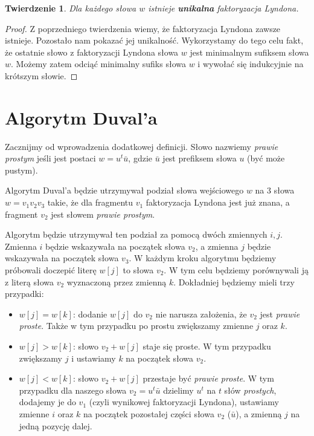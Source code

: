 \documentclass{article}
\newtheorem{theorem}{Twierdzenie}
\begin{document}
\begin{theorem}
    Dla każdego słowa $w$ istnieje \textbf{unikalna} faktoryzacja Lyndona.
\end{theorem}

\begin{proof}
    Z poprzedniego twierdzenia wiemy, że faktoryzacja Lyndona zawsze istnieje. Pozostało nam pokazać jej unikalność.
    Wykorzystamy do tego celu fakt, że ostatnie słowo z faktoryzacji Lyndona słowa $w$ jest minimalnym sufiksem słowa $w$. 
    Możemy zatem odciąć minimalny sufiks słowa $w$ i wywołać się indukcyjnie na krótszym słowie.
\end{proof}

\section{Algorytm Duval'a}

Zacznijmy od wprowadzenia dodatkowej definicji. Słowo nazwiemy \textit{prawie prostym} jeśli jest postaci $w = u^t\bar{u}$, gdzie 
$\bar{u}$ jest prefiksem słowa $u$ (być może pustym).

Algorytm Duval'a będzie utrzymywał podział słowa wejściowego $w$ na $3$ słowa $w=v_1v_2v_3$ takie, że dla fragmentu $v_1$ faktoryzacja Lyndona jest już znana, 
a fragment $v_2$ jest słowem \textit{prawie prostym}. 

Algorytm będzie utrzymywał ten podział za pomocą dwóch zmiennych $i, j$. Zmienna $i$ będzie wskazywała na początek słowa $v_2$, a zmienna $j$ będzie wskazywała na początek słowa $v_3$. 
W każdym kroku algorytmu będziemy próbowali doczepić literę $w[j]$ to słowa $v_2$. W tym celu będziemy porównywali ją z literą słowa $v_2$ wyznaczoną przez zmienną $k$. 
Dokładniej będziemy mieli trzy przypadki:
\begin{itemize}
    \item $w[j] = w[k]$: dodanie $w[j]$ do $v_2$ nie narusza założenia, że $v_2$ jest \textit{prawie proste}. Także w tym przypadku po prostu zwiększamy zmienne $j$ oraz $k$.
    \item $w[j] > w[k]$: słowo $v_2 + w[j]$ staje się proste. W tym przypadku zwiększamy $j$ i ustawiamy $k$ na początek słowa $v_2$.
    \item $w[j] < w[k]$: słowo $v_2 + w[j]$ przestaje być \textit{prawie proste}. W tym przypadku dla naszego słowa $v_2 = u^t\bar{u}$ dzielimy $u^t$ na $t$ słów \textit{prostych},
    dodajemy je do $v_1$ (czyli wynikowej faktoryzacji Lyndona), ustawiamy zmienne $i$ oraz $k$ na początek pozostałej części słowa $v_2$ ($\bar{u}$), a zmienną $j$ na jedną pozycję dalej.
\end{itemize}
\end{document}
